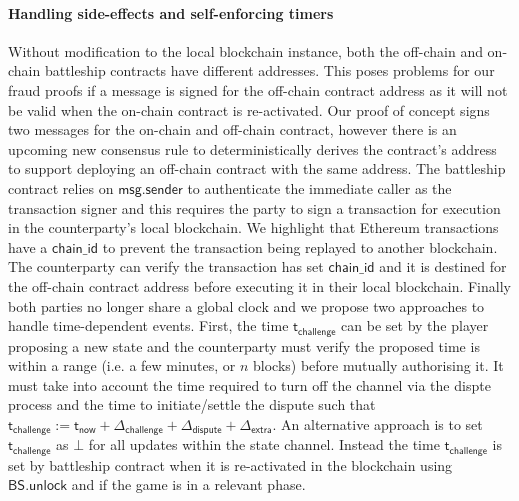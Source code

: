 \documentclass{llncs}
\newcommand{\battleshipunlock}{\mathsf{BS.unlock}}
\newcommand{\appcontract}{\mathsf{AC}}
\newcommand{\timerchallenge}{\mathsf{\Delta}_{\mathsf{challenge}}}
\newcommand{\timechallenge}{\mathsf{t}_{\mathsf{challenge}}}
\newcommand{\timerextra}{\mathsf{\Delta}_{\mathsf{extra}}}
\newcommand{\timerdispute}{\mathsf{\Delta}_{\mathsf{dispute}}}
\newcommand{\timenow}{\mathsf{t}_{\mathsf{now}}}
\begin{document}
\paragraph{Handling side-effects and self-enforcing  timers} \label{sec:sideffectshandle}
Without modification to the local blockchain instance, both the off-chain and on-chain battleship contracts have different addresses.
This poses problems for our fraud proofs if a message is signed for the off-chain contract address as it will not be valid when the on-chain contract is re-activated.
Our proof of concept signs two messages for the on-chain and off-chain contract, however there is an upcoming new consensus rule \cite{eip1014} to deterministically derives the contract's address to support deploying an off-chain contract with the same address. 
The battleship contract relies on $\mathsf{msg.sender}$ to authenticate the immediate caller as the transaction signer and this requires the party to sign a transaction for execution in the counterparty's local blockchain. 
We highlight that Ethereum transactions have a $\mathsf{chain\_id}$ to prevent the transaction being replayed to another blockchain.
The counterparty can verify the transaction has set  $\mathsf{chain\_id}$  and it is destined for the off-chain contract address before executing it in their local blockchain. 
Finally both parties no longer share a global clock and we propose two approaches to handle time-dependent events. 
First, the time $\timechallenge$ can be set by the player proposing a new state and the counterparty must verify the proposed time is within a range (i.e. a few minutes, or $n$ blocks) before mutually authorising it.
It must take into account the time required to turn off the channel via the dispte process and the time to initiate/settle the dispute such that $\timechallenge := \timenow + \timerchallenge + \timerdispute + \timerextra$. 
An alternative approach is to set $\timechallenge$ as $\bot$ for all updates within the state channel. 
Instead the time $\timechallenge$ is set by battleship contract when it is re-activated in the blockchain using $\battleshipunlock$ and if the game is in a relevant phase.
\end{document}
